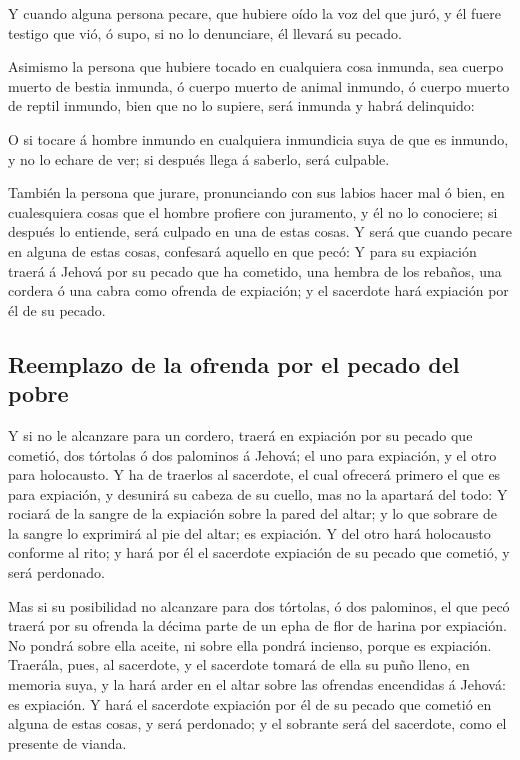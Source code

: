  Y cuando alguna persona pecare, que hubiere oído la voz del
que juró, y él fuere testigo que vió, ó supo, si no lo denunciare, él
llevará su pecado.

 Asimismo la persona que hubiere tocado en cualquiera cosa
inmunda, sea cuerpo muerto de bestia inmunda, ó cuerpo muerto de animal
inmundo, ó cuerpo muerto de reptil inmundo, bien que no lo supiere, será
inmunda y habrá delinquido:

 O si tocare á hombre inmundo en cualquiera inmundicia suya
de que es inmundo, y no lo echare de ver; si después llega á saberlo,
será culpable.

 También la persona que jurare, pronunciando con sus labios
hacer mal ó bien, en cualesquiera cosas que el hombre profiere con
juramento, y él no lo conociere; si después lo entiende, será culpado en
una de estas cosas.  Y será que cuando pecare en alguna de
estas cosas, confesará aquello en que pecó:  Y para su
expiación traerá á Jehová por su pecado que ha cometido, una hembra de
los rebaños, una cordera ó una cabra como ofrenda de expiación; y el
sacerdote hará expiación por él de su pecado.

\hypertarget{reemplazo-de-la-ofrenda-por-el-pecado-del-pobre}{%
\subsection{Reemplazo de la ofrenda por el pecado del
pobre}\label{reemplazo-de-la-ofrenda-por-el-pecado-del-pobre}}

 Y si no le alcanzare para un cordero, traerá en expiación
por su pecado que cometió, dos tórtolas ó dos palominos á Jehová; el uno
para expiación, y el otro para holocausto.  Y ha de traerlos
al sacerdote, el cual ofrecerá primero el que es para expiación, y
desunirá su cabeza de su cuello, mas no la apartará del todo:
 Y rociará de la sangre de la expiación sobre la pared del
altar; y lo que sobrare de la sangre lo exprimirá al pie del altar; es
expiación.  Y del otro hará holocausto conforme al rito; y
hará por él el sacerdote expiación de su pecado que cometió, y será
perdonado.

 Mas si su posibilidad no alcanzare para dos tórtolas, ó
dos palominos, el que pecó traerá por su ofrenda la décima parte de un
epha de flor de harina por expiación. No pondrá sobre ella aceite, ni
sobre ella pondrá incienso, porque es expiación.  Traerála,
pues, al sacerdote, y el sacerdote tomará de ella su puño lleno, en
memoria suya, y la hará arder en el altar sobre las ofrendas encendidas
á Jehová: es expiación.  Y hará el sacerdote expiación por
él de su pecado que cometió en alguna de estas cosas, y será perdonado;
y el sobrante será del sacerdote, como el presente de vianda.

